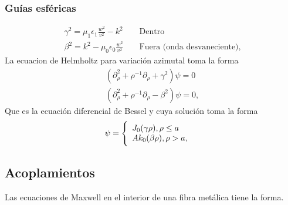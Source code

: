 \subsubsection{Guías esféricas}
\begin{subequations}
	\begin{align}
	\gamma^2 =  \mu_{1} \epsilon_{1} \frac{w^2}{v^2} - k^2   && \text{  Dentro}\\
	\beta^2 = k^2 - \mu_{0} \epsilon_{0} \frac{w^2}{v^2}   && \text{ Fuera (onda desvaneciente)},
	\end{align}
\end{subequations}
La ecuacion de Helmholtz para variación azimutal toma la forma
\begin{subequations}
	\begin{align}
	(\partial_{\rho}^2+\rho^{-1} \partial_{\rho}+\gamma^2) \psi = 0\\
	(\partial_{\rho}^2+\rho^{-1} \partial_{\rho}-\beta^2) \psi = 0,
	\end{align}
\end{subequations}
Que es la ecuación diferencial de Bessel y cuya solución toma la forma
 \label{Soluciones metalico bessel}
\begin{eqnarray}
\psi   & =  \Bigg\{ 
\begin{array}{ll}
J_{0}(\gamma \rho), \rho \leq a \hfill \\ 
 A k_{0} (\beta \rho), \rho > a ,
 \end{array}
\end{eqnarray}


\subsection{Acoplamientos}
Las ecuaciones de Maxwell en el interior de una fibra metálica tiene la forma.
